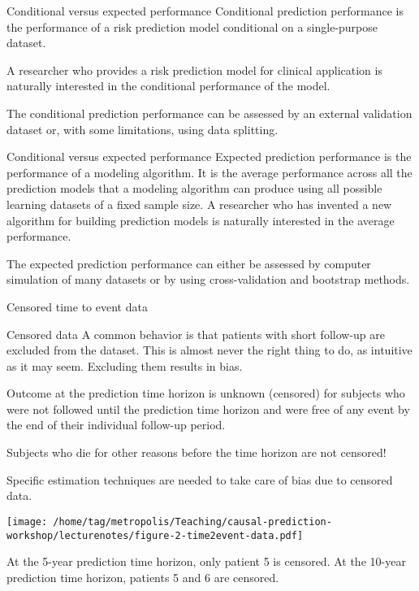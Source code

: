 \documentclass{beamer}\usepackage{listings}
\begin{document}
\begin{frame}[label={sec:orgaee921a}]{Conditional versus expected performance}
Conditional prediction performance is the performance of a risk
prediction model conditional on a single-purpose dataset. 
\vfill

A researcher who provides a risk prediction model for clinical
application is naturally interested in the conditional performance of
the model.
\vfill

The conditional prediction performance can be assessed by
an external validation dataset or, with some limitations, using data
splitting.  
\end{frame}
\begin{frame}[label={sec:orgad18fbd}]{Conditional versus expected performance}
Expected prediction performance is the performance
of a modeling algorithm.
It is the average performance across all the
prediction models that a modeling algorithm can produce using all
possible learning datasets of a fixed sample size.
\vfill
A researcher who
has invented a new algorithm for building prediction models is
naturally interested in the average performance.

\vfill
The expected
prediction performance can either be assessed by computer simulation
of many datasets or by using cross-validation and bootstrap methods.
\end{frame}
\begin{frame}[label={sec:org106e403}]{}
\huge \color{white}
Censored time to event data
\end{frame}
\begin{frame}[label={sec:org5ac291f}]{Censored data}
A common behavior is that patients with short follow-up are excluded
from the dataset. This is almost never the right thing to do, as
intuitive as it may seem. Excluding them results in bias.
\vfill

Outcome at the prediction time horizon is unknown (censored) for
subjects who were not followed until the prediction time horizon and
were free of any event by the end of their individual follow-up
period.  \vfill

Subjects who die for other reasons before the time horizon are not censored!

\vfill
Specific estimation techniques are needed to take care of bias due to
censored data.
\end{frame}
\begin{frame}[label={sec:orge4ee255},shrink=25]{}
\begin{center}
\texttt{[image: /home/tag/metropolis/Teaching/causal-prediction-workshop/lecturenotes/figure-2-time2event-data.pdf]}
\end{center}

At the 5-year prediction time horizon, only patient 5 is censored. At
the 10-year prediction time horizon, patients 5 and 6 are censored.
\end{frame}
\end{document}
